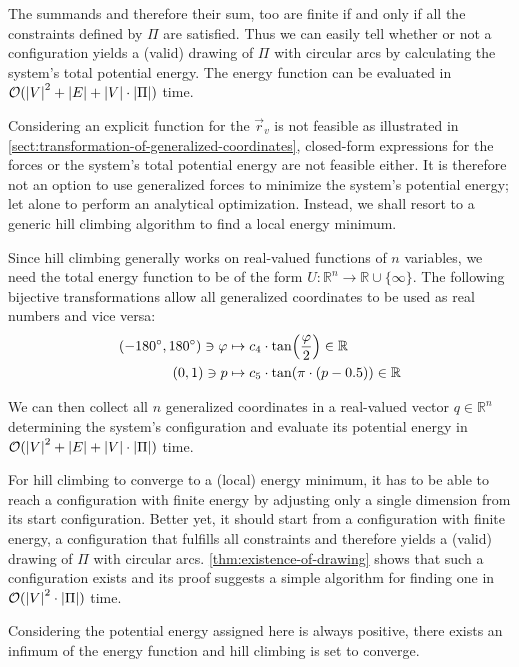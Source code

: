 \noindent
The summands \emdash and therefore their sum, too \emdash are finite if and only if all the constraints defined by ${\Pi}$ are satisfied. Thus we can easily tell whether or not a configuration yields a (valid) drawing of ${\Pi}$ with circular arcs by calculating the system's total potential energy. The energy function can be evaluated in ${\mathcal{O}(\left\lvert V\right\rvert^2 + \left\lvert E\right\rvert + \left\lvert V\right\rvert \cdot \left\lvert\Pi\right\rvert)}$ time.





\hfill


Considering an explicit function for the ${\vec{r}_v}$ is not feasible as illustrated in \cref{sect:transformation-of-generalized-coordinates}, closed-form expressions for the forces or the system's total potential energy are not feasible either. It is therefore not an option to use generalized forces to minimize the system's potential energy; let alone to perform an analytical optimization. Instead, we shall resort to a generic hill climbing algorithm to find a local energy minimum.

Since hill climbing generally works on real-valued functions of ${n}$ variables, we need the total energy function to be of the form ${U \colon \mathbb{R}^n \to \mathbb{R} \cup \lbrace\infty\rbrace}$. The following bijective transformations allow all generalized coordinates to be used as real numbers and vice versa:
%
\begin{align*}
  (-180 ^{\circ}, 180 ^{\circ}) \ni \varphi & \mapsto c_4 \cdot {\tan}{\left({\frac{\varphi}{2}}\right)} \in \mathbb{R}
  \\
  (0, 1) \ni p & \mapsto c_5 \cdot {\tan}{\left({\pi \cdot (p - 0.5)}\right)} \in \mathbb{R}
\end{align*}


\noindent
We can then collect all ${n}$ generalized coordinates in a real-valued vector ${q \in \mathbb{R}^n}$ determining the system's configuration and evaluate its potential energy in ${\mathcal{O}(\left\lvert V\right\rvert^2 + \left\lvert E\right\rvert + \left\lvert V\right\rvert \cdot \left\lvert\Pi\right\rvert)}$ time.

\hfill


\noindent
For hill climbing to converge to a (local) energy minimum, it has to be able to reach a configuration with finite energy by adjusting only a single dimension from its start configuration. Better yet, it should start from a configuration with finite energy, \ie{} a configuration that fulfills all constraints and therefore yields a (valid) drawing of ${\Pi}$ with circular arcs. \autoref{thm:existence-of-drawing} shows that such a configuration exists and its proof suggests a simple algorithm for finding one in ${\mathcal{O}(\left\lvert V\right\rvert^2 \cdot \left\lvert\Pi\right\rvert)}$ time.

Considering the potential energy assigned here is always positive, there exists an infimum of the energy function and hill climbing is set to converge.

